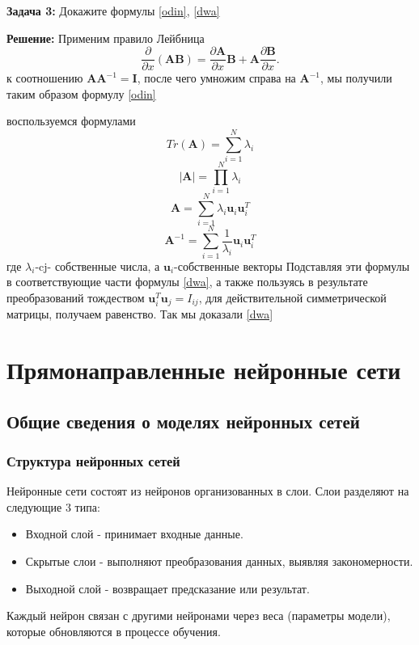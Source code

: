 \textbf{Задача 3:}
Докажите формулы \ref{odin}, \ref{dwa} \

\textbf{Решение:}
Применим правило Лейбница
\[
\frac{\partial}{\partial x} (\mathbf{AB})=\frac{\partial \mathbf{A}}{\partial x}
 \mathbf{B}+\mathbf{A}\frac{\partial \mathbf{B}}{\partial x}.
\]
к соотношению $\mathbf{AA}^{-1}=\mathbf{I}$, после чего умножим справа на $\mathbf{A}^{-1}$, мы получили таким образом формулу \ref{odin}

воспользуемся формулами 
\[
Tr(\mathbf{A})=\displaystyle \sum_{i=1}^{N} \lambda_i
\]
\[
|\mathbf{A}|=\displaystyle \prod_{i=1}^{N} \lambda_i
\]
\[
\mathbf{A}=\displaystyle \sum_{i=1}^{N} \lambda_i \mathbf{u}_i\mathbf{u}_i^{T}
\]
\[
\mathbf{A}^{-1}=\displaystyle \sum_{i=1}^{N} \frac{1}{\lambda_i} \mathbf{u}_i\mathbf{u}_i^{T}
\]
где $\lambda_i$-cj- собственные числа, а $\mathbf{u}_i$-собственные векторы
Подставляя эти формулы в соответствующие части формулы \ref{dwa}, а также пользуясь в результате преобразований тождеством $\mathbf{u}_i^{T}\mathbf{u}_j=I_{ij}$, для действительной симметрической матрицы, получаем равенство. Так мы доказали \ref{dwa}

\section{Прямонаправленные нейронные сети}
\subsection{Общие сведения о моделях нейронных сетей}

\subsubsection{Структура нейронных сетей}

Нейронные сети состоят из нейронов организованных в слои. Слои разделяют на следующие 3 типа:
\begin{itemize}
\item Входной слой - принимает входные данные.
\item Скрытые слои - выполняют преобразования данных, выявляя закономерности.
\item Выходной слой - возвращает предсказание или результат.
\end{itemize}

Каждый нейрон связан с другими нейронами через веса (параметры модели), которые обновляются в
процессе обучения.
